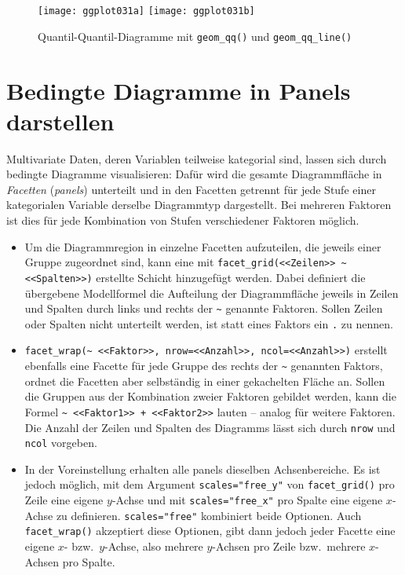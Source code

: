 \begin{figure}[ht]
\centering
\texttt{[image: ggplot031a]}
\texttt{[image: ggplot031b]}
\vspace*{-0.5em}
\caption{Quantil-Quantil-Diagramme mit \lstinline!geom_qq()! und \lstinline!geom_qq_line()!}
\label{fig:ggplot031}
\end{figure}

\section{Bedingte Diagramme in Panels darstellen}
\label{sec:ggplotFacet}


Multivariate Daten, deren Variablen teilweise kategorial sind, lassen sich durch bedingte Diagramme visualisieren: Dafür wird die gesamte Diagrammfläche in \emph{Facetten} (\emph{panels}) unterteilt und in den Facetten getrennt für jede Stufe einer kategorialen Variable derselbe Diagrammtyp dargestellt. Bei mehreren Faktoren ist dies für jede Kombination von Stufen verschiedener Faktoren möglich.

\begin{itemize}
\item Um die Diagrammregion in einzelne Facetten aufzuteilen, die jeweils einer Gruppe zugeordnet sind, kann eine mit  \lstinline!facet_grid(<<Zeilen>> ~ <<Spalten>>)! erstellte Schicht hinzugefügt werden. Dabei definiert die übergebene Modellformel die Aufteilung der Diagrammfläche jeweils in Zeilen und Spalten durch links und rechts der \lstinline!~! genannte Faktoren. Sollen Zeilen oder Spalten nicht unterteilt werden, ist statt eines Faktors ein \lstinline!.! zu nennen.
\item {} \lstinline!facet_wrap(~ <<Faktor>>, nrow=<<Anzahl>>, ncol=<<Anzahl>>)! erstellt ebenfalls eine Facette für jede Gruppe des rechts der \lstinline!~! genannten Faktors, ordnet die Facetten aber selbständig in einer gekachelten Fläche an. Sollen die Gruppen aus der Kombination zweier Faktoren gebildet werden, kann die Formel \lstinline!~ <<Faktor1>> + <<Faktor2>>! lauten -- analog für weitere Faktoren. Die Anzahl der Zeilen und Spalten des Diagramms lässt sich durch \lstinline!nrow! und \lstinline!ncol! vorgeben.
\item In der Voreinstellung erhalten alle panels dieselben Achsenbereiche. Es ist jedoch möglich, mit dem Argument \lstinline!scales="free_y"! von \lstinline!facet_grid()! pro Zeile eine eigene $y$-Achse und mit \lstinline!scales="free_x"! pro Spalte eine eigene $x$-Achse zu definieren. \lstinline!scales="free"! kombiniert beide Optionen. Auch \lstinline!facet_wrap()! akzeptiert diese Optionen, gibt dann jedoch jeder Facette eine eigene $x$- bzw.\ $y$-Achse, also mehrere $y$-Achsen pro Zeile bzw.\ mehrere $x$-Achsen pro Spalte.
\end{itemize}

